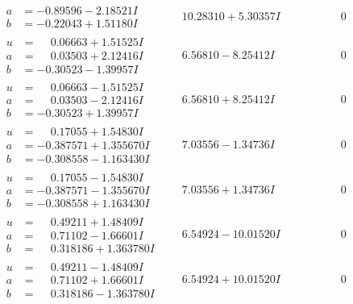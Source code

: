 \documentclass[1p]{elsarticle_modified}
\theoremstyle{definition}
\begin{document}
$$\begin{array}{c|c|c}
\begin{aligned}
a &= -0.89596 - 2.18521 I \\
b &= -0.22043 + 1.51180 I\end{aligned}
 & \phantom{-}10.28310 + 5.30357 I & \phantom{-0.000000 } 0 \\ \hline\begin{aligned}
u &= \phantom{-}0.06663 + 1.51525 I \\
a &= \phantom{-}0.03503 + 2.12416 I \\
b &= -0.30523 - 1.39957 I\end{aligned}
 & \phantom{-}6.56810 - 8.25412 I & \phantom{-0.000000 } 0 \\ \hline\begin{aligned}
u &= \phantom{-}0.06663 - 1.51525 I \\
a &= \phantom{-}0.03503 - 2.12416 I \\
b &= -0.30523 + 1.39957 I\end{aligned}
 & \phantom{-}6.56810 + 8.25412 I & \phantom{-0.000000 } 0 \\ \hline\begin{aligned}
u &= \phantom{-}0.17055 + 1.54830 I \\
a &= -0.387571 + 1.355670 I \\
b &= -0.308558 - 1.163430 I\end{aligned}
 & \phantom{-}7.03556 - 1.34736 I & \phantom{-0.000000 } 0 \\ \hline\begin{aligned}
u &= \phantom{-}0.17055 - 1.54830 I \\
a &= -0.387571 - 1.355670 I \\
b &= -0.308558 + 1.163430 I\end{aligned}
 & \phantom{-}7.03556 + 1.34736 I & \phantom{-0.000000 } 0 \\ \hline\begin{aligned}
u &= \phantom{-}0.49211 + 1.48409 I \\
a &= \phantom{-}0.71102 - 1.66601 I \\
b &= \phantom{-}0.318186 + 1.363780 I\end{aligned}
 & \phantom{-}6.54924 - 10.01520 I & \phantom{-0.000000 } 0 \\ \hline\begin{aligned}
u &= \phantom{-}0.49211 - 1.48409 I \\
a &= \phantom{-}0.71102 + 1.66601 I \\
b &= \phantom{-}0.318186 - 1.363780 I\end{aligned}
 & \phantom{-}6.54924 + 10.01520 I & \phantom{-0.000000 } 0 \\ \hline\begin{aligned}

\end{aligned}
\end{array}$$
\end{document}
